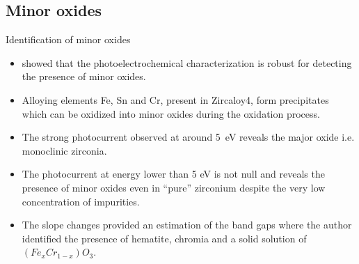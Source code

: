 \documentclass[10pt,compress]{beamer}
\begin{document}
\subsection{Minor oxides}
\begin{frame}[allowframebreaks=1.0]{Identification of minor oxides}
    
    \begin{itemize}
        \item \citet{benaboud2007} showed that the photoelectrochemical characterization 
        is robust for detecting the presence of minor oxides. 
        \item Alloying elements Fe, Sn and Cr, present in Zircaloy4, form precipitates 
        which can be oxidized into minor oxides during the oxidation process.
        \item The strong photocurrent observed at around 5~eV 
              reveals the major oxide i.e. monoclinic zirconia. 
        \item The photocurrent at energy lower than 5 eV is not null and reveals the 
              presence of minor oxides even in “pure” zirconium despite the very low 
              concentration of impurities. 
        \item The slope changes provided an estimation of the band gaps where the author 
              identified the presence of hematite, chromia and a solid solution of 
              $(Fe_xCr_{1-x})O_3$. 
    \end{itemize}


\end{frame}
\end{document}
